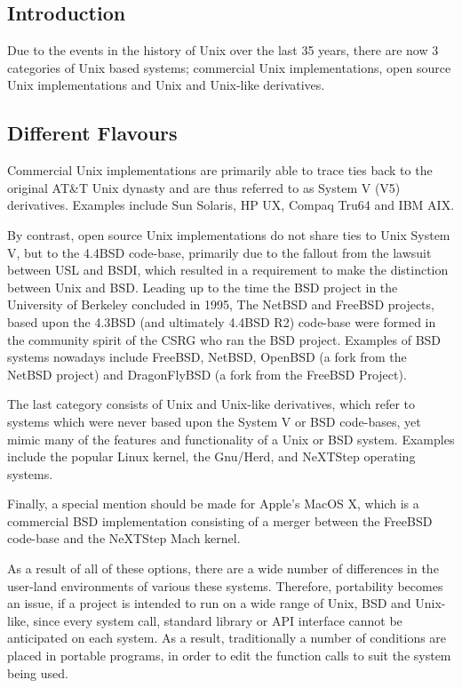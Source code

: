 
\subsection{Introduction}

Due to the events in the history of Unix over the last 35 years, there
are now 3 categories of Unix based systems; commercial Unix
implementations, open source Unix implementations and Unix and Unix-like 
derivatives.

\subsection{Different Flavours}

Commercial Unix implementations are primarily able to trace ties back to
the original AT\&T Unix dynasty and are thus referred to as System V (V5)
derivatives. Examples include Sun Solaris, HP UX, Compaq
Tru64 and IBM AIX. 


By contrast, open source Unix implementations do not share ties to Unix 
System V, but to the 4.4BSD code-base, primarily due to the fallout from 
the lawsuit between USL and BSDI, which resulted in a requirement to
make the distinction between Unix and BSD. Leading up to the time the 
BSD project in the University of Berkeley concluded in 1995, The NetBSD
and FreeBSD projects, based upon the 4.3BSD (and ultimately 4.4BSD R2) 
code-base were formed in the community spirit of the CSRG who ran the BSD
project. Examples of BSD systems nowadays include FreeBSD, NetBSD,
OpenBSD (a fork from the NetBSD project) and DragonFlyBSD (a fork from
the FreeBSD Project).


The last category consists of Unix and Unix-like derivatives, which
refer to systems which were never based upon the System V or BSD
code-bases, yet mimic many of the features and functionality of a Unix or
BSD system. Examples include the popular Linux kernel, the Gnu/Herd,
and NeXTStep operating systems.


Finally, a special mention should be made for Apple's MacOS X, which is
a commercial BSD implementation consisting of a merger between the
FreeBSD code-base and the NeXTStep Mach kernel.


As a result of all of these options, there are a wide number of
differences in the user-land environments of various these systems.
Therefore, portability becomes an issue, if a project is intended to run
on a wide range of Unix, BSD and Unix-like, since every system call, 
standard library or API interface cannot be anticipated on each system.
As a result, traditionally a number of conditions are placed in portable
programs, in order to edit the function calls to suit the system being
used.

